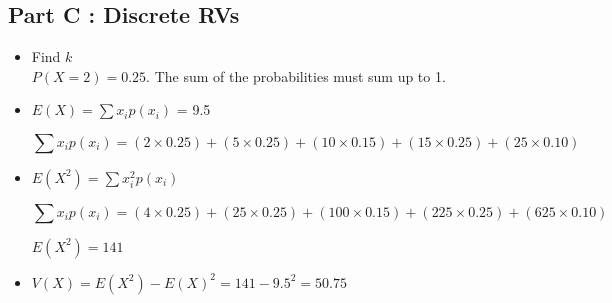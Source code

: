 

\subsection*{Part C : Discrete RVs}
\begin{itemize}
\item Find $k$\\
$P(X=2) = 0.25$. The sum of the probabilities must sum up to 1.

\item $E(X) = \sum x_i p(x_i)$ = 9.5

\[\sum x_i p(x_i) = (2\times 0.25) + (5 \times 0.25) + (10 \times 0.15) + (15 \times 0.25) + (25 \times 0.10) \]



\item $E(X^2) = \sum x^2_i p(x_i)$

\[\sum x_i p(x_i) = (4\times 0.25) + (25 \times 0.25) + (100 \times 0.15) + (225 \times 0.25) + (625 \times 0.10) \]


$E(X^2) = 141$

\item $V(X) = E(X^2) - E(X)^2 = 141-9.5^2 = 50.75$
\end{itemize}
